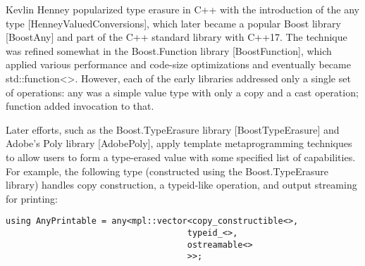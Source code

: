 Kevlin Henney popularized type erasure in C++ with the introduction of the any type [HenneyValuedConversions], which later became a popular Boost library [BoostAny] and part of the C++ standard library with C++17. The technique was refined somewhat in the Boost.Function library [BoostFunction], which applied various performance and code-size optimizations and eventually became std::function<>. However, each of the early libraries addressed only a single set of operations: any was a simple value type with only a copy and a cast operation; function added invocation to that.

Later efforts, such as the Boost.TypeErasure library [BoostTypeErasure] and Adobe’s Poly library [AdobePoly], apply template metaprogramming techniques to allow users to form a type-erased value with some specified list of capabilities. For example, the following type (constructed using the Boost.TypeErasure library) handles copy construction, a typeid-like operation, and output streaming for printing:

\begin{lstlisting}[style=styleCXX]
using AnyPrintable = any<mpl::vector<copy_constructible<>,
									typeid_<>,
									ostreamable<>
									>>;
\end{lstlisting}